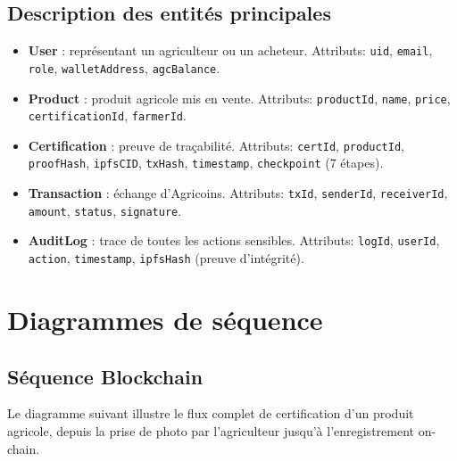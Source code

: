 \documentclass[12pt,a4paper]{report}
\begin{document}
\subsection{Description des entités principales}

\begin{tcolorbox}[definbox,title={Entités principales du modèle de données}]
  \begin{itemize}[itemsep=4pt]
    \item \textbf{User} : représentant un agriculteur ou un acheteur. Attributs: \texttt{uid},
          \texttt{email}, \texttt{role}, \texttt{walletAddress}, \texttt{agcBalance}.
    \item \textbf{Product} : produit agricole mis en vente. Attributs: \texttt{productId},
          \texttt{name}, \texttt{price}, \texttt{certificationId}, \texttt{farmerId}.
    \item \textbf{Certification} : preuve de traçabilité. Attributs: \texttt{certId},
          \texttt{productId}, \texttt{proofHash}, \texttt{ipfsCID}, \texttt{txHash},
          \texttt{timestamp}, \texttt{checkpoint} (7 étapes).
    \item \textbf{Transaction} : échange d'Agricoins. Attributs: \texttt{txId},
          \texttt{senderId}, \texttt{receiverId}, \texttt{amount}, \texttt{status},
          \texttt{signature}.
    \item \textbf{AuditLog} : trace de toutes les actions sensibles. Attributs:
          \texttt{logId}, \texttt{userId}, \texttt{action}, \texttt{timestamp},
          \texttt{ipfsHash} (preuve d'intégrité).
  \end{itemize}
\end{tcolorbox}

\vspace{0.5cm}

\section{Diagrammes de séquence}

\subsection{Séquence Blockchain}

\noindent
Le diagramme suivant illustre le flux complet de certification d'un produit agricole,
depuis la prise de photo par l'agriculteur jusqu'à l'enregistrement on-chain.

\vspace{0.3cm}
\end{document}
